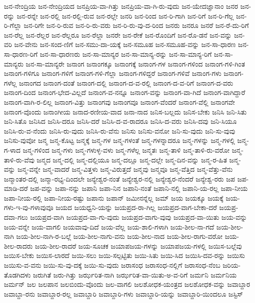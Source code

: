{ಜನ-ನೇಂದ್ರಿಯ
ಜನ-ನೇಂದ್ರಿಯದ
ಜನಪ್ರಿಯ-ವಾ-ಗಿತ್ತು
ಜನಪ್ರಿಯ-ವಾ-ಗಿ-ರು-ವುದು
ಜನ-ಯೇದಜ್ಞಾನಾಂ
ಜನರ
ಜನ-ರನ್ನು
ಜನ-ರನ್ನೇ
ಜನ-ರಲ್ಲಿ
ಜನ-ರಲ್ಲಿ-ರುವ
ಜನ-ರಲ್ಲೇ
ಜನರಿ
ಜನ-ರಿಂದ
ಜನ-ರಿ-ಗಾಗಿ
ಜನ-ರಿಗೆ
ಜನ-ರಿ-ಗೆಲ್ಲ
ಜನ-ರಿ-ಗೆಲ್ಲಾ
ಜನ-ರಿಗೇ
ಜನ-ರಿ-ರುವ
ಜನ-ರಿ-ರು-ವರು
ಜನ-ರಿ-ರು-ವು-ದ-ರಿಂದ
ಜನರು
ಜನರೂ
ಜನರೆ
ಜನ-ರೆ-ದು-ರಿಗೆ
ಜನ-ರೆಲ್ಲ
ಜನ-ರೆಲ್ಲರ
ಜನ-ರೆಲ್ಲರೂ
ಜನ-ರೆಲ್ಲಾ
ಜನರೇ
ಜನ-ರೇಕೆ
ಜನ-ರೊಂದಿಗೆ
ಜನ-ರೊ-ಡನೆ
ಜನ-ವನ್ನು
ಜನ-ವರಿ
ಜನ-ವೇನು
ಜನ-ಸಂದ-ಣಿಗೆ
ಜನ-ಸಮು-ದಾ-ಯಕ್ಕೆ
ಜನ-ಸಮೂಹ
ಜನ-ಸಮೂಹ-ವನ್ನು
ಜನ-ಸಾ-ಧಾರಣ
ಜನ-ಸಾ-ಧಾರಣ-ರಿಗೆ
ಜನ-ಸಾ-ಧಾರಣರು
ಜನ-ಸಾ-ಮಾನ್ಯರ
ಜನ-ಸಾ-ಮಾನ್ಯ-ರನ್ನು
ಜನ-ಸಾ-ಮಾನ್ಯ-ರಿಗೆ
ಜನ-ಸಾ-ಮಾನ್ಯರು
ಜನ-ಸಾ-ಮಾನ್ಯರೇ
ಜನಾಂಗ
ಜನಾಂಗಕ್ಕೂ
ಜನಾಂಗಕ್ಕೆ
ಜನಾಂಗ-ಗಳ
ಜನಾಂಗ-ಗಳಿಂದ
ಜನಾಂಗ-ಗಳಿ-ಗಿಂತ
ಜನಾಂಗ-ಗಳಿಗೂ
ಜನಾಂಗ-ಗಳಿಗೆ
ಜನಾಂಗ-ಗಳಿ-ಗೆಲ್ಲಾ
ಜನಾಂಗ-ಗಳಿದ್ದರೆ
ಜನಾಂಗ-ಗಳಿವೆ
ಜನಾಂಗ-ಗಳು
ಜನಾಂಗ-ಗಳೆಲ್ಲ
ಜನಾಂಗದ
ಜನಾಂಗ-ದಂತೆ
ಜನಾಂಗ-ದಲ್ಲಿ
ಜನಾಂಗ-ದ-ವ-ರಲ್ಲಿ
ಜನಾಂಗ-ದ-ವ-ರಿಗೆ
ಜನಾಂಗ-ದ-ವರು
ಜನಾಂಗ-ದಿಂದ
ಜನಾಂಗ-ಭೇದ-ವಿಲ್ಲದೆ
ಜನಾಂಗ-ವ-ನನ್ನೂ
ಜನಾಂಗ-ವನ್ನು
ಜನಾಂಗ-ವಾ-ಗಿದೆ
ಜನಾಂಗ-ವಾಗಿದ್ದಾರೆ
ಜನಾಂಗ-ವಾಗಿ-ರ-ಲಿಲ್ಲ
ಜನಾಂಗ-ವಿತ್ತು
ಜನಾಂಗವು
ಜನಾಂಗವೂ
ಜನಾಂಗ-ವೆಂದರೆ
ಜನಾಂಗ-ವೆಲ್ಲಿ
ಜನಾಂಗವೇ
ಜನಾಂಗ-ವೊಂದು
ಜನಾಂಗೀಯ
ಜನಾದ-ರಣೀಯ-ವಾದ
ಜನಾ-ನಾದ
ಜನಿಸ-ಬಲ್ಲದು
ಜನಿಸ-ಬೇಕು
ಜನಿಸಿ
ಜನಿ-ಸಿತು
ಜನಿ-ಸಿತೊ
ಜನಿಸಿದ
ಜನಿಸಿ-ದರೂ
ಜನಿಸಿ-ದರೆ
ಜನಿಸಿ-ದ-ವ-ರಾದರೂ
ಜನಿಸಿ-ದ-ವರು
ಜನಿಸಿ-ದವು
ಜನಿ-ಸಿಯೂ
ಜನಿಸಿ-ರು-ವ-ನೆಂದು
ಜನಿಸಿ-ರು-ವುದು
ಜನಿಸಿ-ರು-ವೆನು
ಜನಿಸು
ಜನಿಸು-ವನೋ
ಜನಿ-ಸು-ವುದು
ಜನಿ-ಸು-ವುವು
ಜನಿಸು-ವುವೋ
ಜನ್ಮ
ಜನ್ಮ-ಕೊಟ್ಟ
ಜನ್ಮಕ್ಕೆ
ಜನ್ಮ-ಗಳ
ಜನ್ಮ-ಗಳಂತೆ
ಜನ್ಮ-ಗಳನ್ನಾದರೂ
ಜನ್ಮ-ಗಳನ್ನು
ಜನ್ಮ-ಗಳಲ್ಲಿ
ಜನ್ಮ-ಗ-ಳಾದ
ಜನ್ಮ-ಗಳಿಂದ
ಜನ್ಮ-ಗಳು
ಜನ್ಮ-ಗಳುಳ್ಳ-ವಳು
ಜನ್ಮ-ಗಳೆಲ್ಲ
ಜನ್ಮತಃ
ಜನ್ಮ-ತಾಳಿ
ಜನ್ಮ-ತಾಳಿ-ರು-ವರೋ
ಜನ್ಮ-ತಾಳಿ-ರು-ವೆವು
ಜನ್ಮದ
ಜನ್ಮ-ದಲ್ಲಿ
ಜನ್ಮ-ದಲ್ಲಿಯೂ
ಜನ್ಮ-ದಲ್ಲೂ
ಜನ್ಮ-ದಲ್ಲೇ
ಜನ್ಮ-ದಿನ-ವನ್ನು
ಜನ್ಮ-ರ-ಹಿತ
ಜನ್ಮ-ವನ್ನು
ಜನ್ಮ-ವನ್ನೇ
ಜನ್ಮ-ವಾದರೆ
ಜನ್ಮ-ವಿತ್ತಳು
ಜನ್ಮ-ವಿರುತ್ತದೆ
ಜನ್ಮವು
ಜನ್ಮವೂ
ಜನ್ಮ-ವೆತ್ತಿದ
ಜನ್ಮ-ವೆತ್ತು-ವೆನು
ಜನ್ಮಾಂತರ-ದಲ್ಲಿ
ಜನ್ಮಾ-ರಭ್ಯ-ದಿಂದಲೇ
ಜನ್ಯೇಶ್ವರ-ನಂತೆ
ಜನ್ಯೇಶ್ವರ-ನಲ್ಲಿ
ಜನ್ಯೇಶ್ವರ-ನೆಂದರೆ
ಜನ್ಯೇಶ್ವ-ರರು
ಜಪ
ಜಪ-ಮಾಡಿ-ದರೆ
ಜಪ-ವನ್ನು
ಜಪಾ-ನನ್ನು
ಜಪಾನಿ
ಜಪಾ-ನಿನ
ಜಪಾನಿ-ನಂತೆ
ಜಪಾನಿ-ನಲ್ಲಿ
ಜಪಾನಿ-ಯ-ರಲ್ಲ
ಜಪಾ-ನೀಯ
ಜಪಾ-ನೀಯ-ರಲ್ಲಿ
ಜಪಾ-ನೀಯ-ರಷ್ಟು
ಜಪಾನು
ಜಪಾನ್
ಜಮೀನನ್ನೆಲ್ಲ
ಜಮ್
ಜಯ
ಜಯಕ್ಕೂ
ಜಯಕ್ಕೆ
ಜಯ-ಗಳು-ಇ-ವು-ಗಳಾವುವೂ
ಜಯದ
ಜಯಧ್ವನಿ-ಯನ್ನು
ಜಯಪ್ರದ-ರಾ-ಗಿಲ್ಲ
ಜಯಪ್ರದ-ವಾಗ-ಬೇಕಾ-ದರೆ
ಜಯಪ್ರ-ದವಾ-ಗಲು
ಜಯಪ್ರದ-ವಾಗಿ
ಜಯಪ್ರದ-ವಾ-ಗು-ವುದು
ಜಯಪ್ರದ-ವಾಗು-ವುವು
ಜಯಪ್ರದ-ವಾ-ಯಿತು
ಜಯ-ವನ್ನು
ಜಯ-ವನ್ನೇ
ಜಯ-ವಾಗಲಿ
ಜಯವಾವು-ದಿದೆ
ಜಯ-ವೆಲ್ಲ
ಜಯ-ಶಾಲಿ-ಗಳಾಗಿ
ಜಯ-ಶೀಲ-ನಾ-ಗದೆ
ಜಯ-ಶೀಲ-ನಾಗಿ
ಜಯ-ಶೀಲ-ನಾಗಿ-ರ-ಬಲ್ಲೆ
ಜಯ-ಶೀಲ-ನಾಗು-ವನು
ಜಯ-ಶೀಲ-ನಾದ
ಜಯ-ಶೀಲ-ರಾಗು-ವರೋ
ಜಯ-ಶೀಲ-ರಾದರು
ಜಯ-ಶೀಲ-ರಾದರೆ
ಜಯ-ಸೂಚಕ
ಜಯಾಪಜಯ-ಗಳನ್ನು
ಜಯಾಪಜಯ-ಗಳಲ್ಲಿ
ಜಯಿಸ-ಬಲ್ಲೆವು
ಜಯಿಸ-ಬೇಕು
ಜಯಿಸ-ಲಾರದೆ
ಜಯಿ-ಸಲು
ಜಯಿ-ಸಲ್ಪಟ್ಟಿತು
ಜಯಿ-ಸಿತು
ಜಯಿ-ಸಿದ
ಜಯಿಸಿ-ದವ-ರನ್ನು
ಜಯಿಸು
ಜಯಿಸು-ವ-ವನು
ಜಯಿ-ಸು-ವು-ದಕ್ಕೆ
ಜಯಿ-ಸು-ವುದು
ಜರಾಸಂಧ
ಜರಾಸಂಧ-ನಲ್ಲಿಗೆ
ಜರಾಸಂಧ-ನೆಂಬ
ಜರಿಯ-ತೊಡಗಿದಳು
ಜರುಗಿತೆ
ಜರು-ಗಿತ್ತು
ಜರ್ಝರಿತ-ನಾಗಿ
ಜರ್ಝರಿತ-ವಾ-ಯಿತು-ಅ-ವ-ರಿಗೆ
ಜರ್ಮನಿ
ಜರ್ಮನಿಯ
ಜರ್ಮನ್
ಜಲ
ಜಲಪಾನ
ಜಲಬಿಂದು-ವೊಂದು
ಜಲ-ವಾಗಲಿ
ಜಲಶೋಧಕ-ಯಂತ್ರದ
ಜಲಶೋಧಕ-ವನ್ನು
ಜವಾಬ್ದಾರ
ಜವಾಬ್ದಾ-ರನು
ಜವಾಬ್ದಾರ-ರಲ್ಲ
ಜವಾಬ್ದಾರಿ
ಜವಾಬ್ದಾರಿ-ಗಳು
ಜವಾಬ್ದಾರಿ-ಯನ್ನು
ಜವಾಬ್ದಾರಿ-ಯಿಂದಲೂ
ಜಸ್ಟಿಸ್
}
